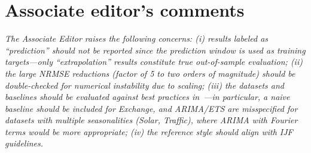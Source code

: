 \documentclass[11pt]{article}
\newcommand{\reviewertext}[1]{%
  \begin{reviewerquote}
    {\color{reviewercolor}\itshape #1}
  \end{reviewerquote}%
}
\begin{document}
\section{Associate editor's comments}

\reviewertext{%
The Associate Editor raises the following concerns: (i) results labeled as ``prediction'' should not be reported since the prediction window is used as training targets---only ``extrapolation'' results constitute true out-of-sample evaluation; (ii) the large NRMSE reductions (factor of 5 to two orders of magnitude) should be double-checked for numerical instability due to scaling; (iii) the datasets and baselines should be evaluated against best practices in~\cite{hewamalage2023forecast}---in particular, a naive baseline should be included for Exchange, and ARIMA/ETS are misspecified for datasets with multiple seasonalities (Solar, Traffic), where ARIMA with Fourier terms would be more appropriate; (iv) the reference style should align with IJF guidelines.
}
\end{document}
